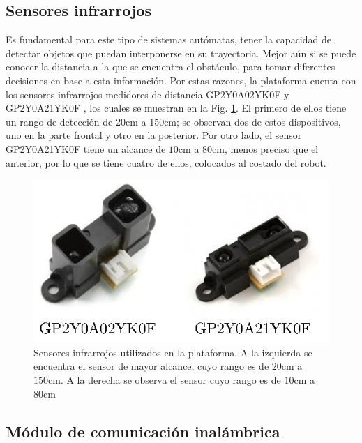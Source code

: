 \documentclass[conference,a4paper,9pt]{IEEEtran}
\begin{document}
\subsection{Sensores infrarrojos}

Es fundamental para este tipo de sistemas autómatas, tener la capacidad de detectar objetos que puedan interponerse en su trayectoria. Mejor aún si se puede conocer la distancia a la que se encuentra el obstáculo, para tomar diferentes decisiones en base a esta información. Por estas razones, la plataforma cuenta con los sensores infrarrojos medidores de distancia GP2Y0A02YK0F \cite{sensor1} y GP2Y0A21YK0F \cite{sensor2}, los cuales se muestran en la Fig. \ref{sensores}. El primero de ellos tiene un rango de detección de $20\mathrm{cm}$ a $150\mathrm{cm}$; se observan dos de estos dispositivos, uno en la parte frontal y otro en la posterior. Por otro lado, el sensor GP2Y0A21YK0F tiene un alcance de $10\mathrm{cm}$ a $80\mathrm{cm}$, menos preciso que el anterior, por lo que se tiene cuatro de ellos, colocados al costado del robot.

\begin{figure}%
\centering\includegraphics[scale=1]{fotos_sensores.eps}%
\caption{Sensores infrarrojos utilizados en la plataforma. A la izquierda se encuentra el sensor de mayor alcance, cuyo rango es de $20\mathrm{cm}$ a $150\mathrm{cm}$. A la derecha se observa el sensor cuyo rango es de $10\mathrm{cm}$ a $80\mathrm{cm}$}%
\label{sensores}%
\end{figure}

\subsection{Módulo de comunicación inalámbrica}
\end{document}
